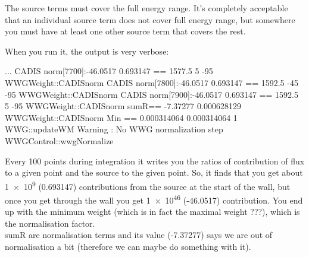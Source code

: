 The source terms must cover the full energy range.
It's completely acceptable that an individual source term does not cover full energy range,
but somewhere you must have at least one other source term that covers the rest.

When you run it, the output is very verbose:
\begin{bash}
...
CADIS norm[7700]:-46.0517 0.693147 == 1577.5 5 -95          WWGWeight::CADISnorm
CADIS norm[7800]:-46.0517 0.693147 == 1592.5 -45 -95        WWGWeight::CADISnorm
CADIS norm[7900]:-46.0517 0.693147 == 1592.5 5 -95          WWGWeight::CADISnorm
sumR== -7.37277 0.000628129                                 WWGWeight::CADISnorm
Min == 0.000314064 0.000314064 1                                  WWG::updateWM
Warning : No WWG normalization step                        WWGControl::wwgNormalize
\end{bash}

Every 100 points during integration it writes you the ratios of contribution of flux to a given point and the source to the given point.
So, it finds that you get about
\num[retain-unity-mantissa=false]{1e9} (0.693147) 
contributions from the source at the start of the wall, but once you get through the wall you get
\num[retain-unity-mantissa=false]{1e46} (-46.0517) contribution.
You end up with the minimum weight (which is in fact the maximal weight \alert{???}), which is the normalisation factor. \\
sumR are normalisation terms and its value (-7.37277) says we are out of normalisation a bit (therefore we can maybe do something with it).


